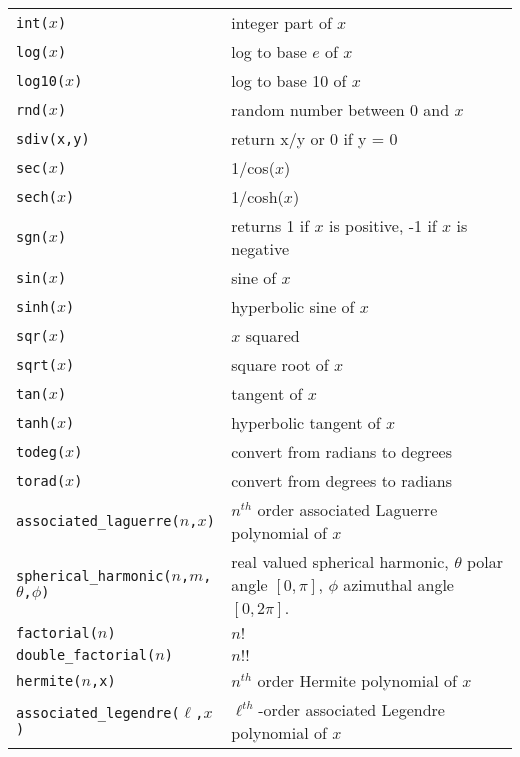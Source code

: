 \begin{supertabular}{ll}
{\tt int($x$)}          	& integer part of $x$ \\
{\tt log($x$)}          	& log to base $e$ of $x$ \\
{\tt log10($x$)}      	& log to base 10 of $x$ \\
{\tt rnd($x$)}          	& random number between 0 and $x$ \\
{\tt sdiv(x,y)} 	     	& return x/y or 0 if y = 0 \\
{\tt sec($x$)} 	     	& 1/cos($x$) \\
{\tt sech($x$)}        	& 1/cosh($x$) \\
{\tt sgn($x$)}          	& returns 1 if $x$ is positive, -1 if $x$ is negative \\
{\tt sin($x$)}          	& sine of $x$ \\
{\tt sinh($x$)}        	& hyperbolic sine of $x$ \\
{\tt sqr($x$)}          	& $x$ squared  \\
{\tt sqrt($x$)}        	& square root of $x$ \\
{\tt tan($x$)}          	& tangent of $x$ \\	
{\tt tanh($x$)}        	& hyperbolic tangent of $x$ \\
{\tt todeg($x$)}      	& convert from radians to degrees \\
{\tt torad($x$)}      	& convert from degrees to radians \\
{\tt associated\_laguerre($n$,$x$)}    & $n^{th}$ order associated Laguerre polynomial of $x$   \\
{\tt spherical\_harmonic($n$,$m$,$\theta$,$\phi$)}        & real valued spherical harmonic, $\theta$ polar angle $[0,\pi]$, $\phi$ azimuthal angle $[0,2\pi]$. \\
{\tt factorial($n$)}      	           & $n!$ \\
{\tt double\_factorial($n$)}       & $n!!$  \\
{\tt hermite($n$,x)}      	               & $n^{th}$ order Hermite polynomial of $x$ \\
{\tt associated\_legendre($\ell$,$x$)}      & $\ell^{th}$-order associated Legendre polynomial of $x$ \\

\end{supertabular}
